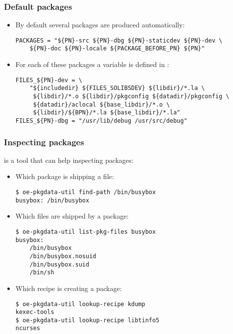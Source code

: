 \begin{frame}[fragile]
  \frametitle{Default packages}
  \begin{itemize}
    \item By default several packages are produced automatically:
    \begin{block}{}
    \begin{verbatim}
PACKAGES = "${PN}-src ${PN}-dbg ${PN}-staticdev ${PN}-dev \
    ${PN}-doc ${PN}-locale ${PACKAGE_BEFORE_PN} ${PN}"
    \end{verbatim}
    \end{block}
    \item For each of these packages a  variable is
      defined in :
    \begin{block}{}
    \begin{verbatim}
FILES_${PN}-dev = \
    "${includedir} ${FILES_SOLIBSDEV} ${libdir}/*.la \
     ${libdir}/*.o ${libdir}/pkgconfig ${datadir}/pkgconfig \
     ${datadir}/aclocal ${base_libdir}/*.o \
     ${libdir}/${BPN}/*.la ${base_libdir}/*.la"
FILES_${PN}-dbg = "/usr/lib/debug /usr/src/debug"
    \end{verbatim}
    \end{block}
  \end{itemize}
\end{frame}

\begin{frame}[fragile]
  \frametitle{Inspecting packages}
   is a tool that can help inspecting
  packages:
  \begin{itemize}
  \item Which package is shipping a file:
    \begin{block}{}
      \begin{verbatim}
$ oe-pkgdata-util find-path /bin/busybox
busybox: /bin/busybox
    \end{verbatim}
    \end{block}
  \item Which files are shipped by a package:
    \begin{block}{}
      \begin{verbatim}
$ oe-pkgdata-util list-pkg-files busybox
busybox:
    /bin/busybox
    /bin/busybox.nosuid
    /bin/busybox.suid
    /bin/sh
    \end{verbatim}
    \end{block}
  \item Which recipe is creating a package:
    \begin{block}{}
      \begin{verbatim}
$ oe-pkgdata-util lookup-recipe kdump
kexec-tools
$ oe-pkgdata-util lookup-recipe libtinfo5
ncurses
    \end{verbatim}
    \end{block}
\end{itemize}
\end{frame}

